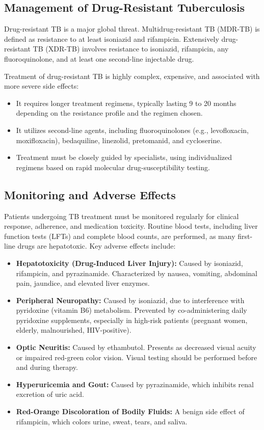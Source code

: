 \subsection*{Management of Drug-Resistant Tuberculosis}
Drug-resistant TB is a major global threat. Multidrug-resistant TB (MDR-TB) is defined as resistance to at least isoniazid and rifampicin. Extensively drug-resistant TB (XDR-TB) involves resistance to isoniazid, rifampicin, any fluoroquinolone, and at least one second-line injectable drug.

Treatment of drug-resistant TB is highly complex, expensive, and associated with more severe side effects:
\begin{itemize}
    \item It requires longer treatment regimens, typically lasting 9 to 20 months depending on the resistance profile and the regimen chosen.
    \item It utilizes second-line agents, including fluoroquinolones (e.g., levofloxacin, moxifloxacin), bedaquiline, linezolid, pretomanid, and cycloserine.
    \item Treatment must be closely guided by specialists, using individualized regimens based on rapid molecular drug-susceptibility testing.
\end{itemize}

\subsection*{Monitoring and Adverse Effects}
Patients undergoing TB treatment must be monitored regularly for clinical response, adherence, and medication toxicity. Routine blood tests, including liver function tests (LFTs) and complete blood counts, are performed, as many first-line drugs are hepatotoxic. Key adverse effects include:
\begin{itemize}
    \item \textbf{Hepatotoxicity (Drug-Induced Liver Injury):} Caused by isoniazid, rifampicin, and pyrazinamide. Characterized by nausea, vomiting, abdominal pain, jaundice, and elevated liver enzymes.
    \item \textbf{Peripheral Neuropathy:} Caused by isoniazid, due to interference with pyridoxine (vitamin B6) metabolism. Prevented by co-administering daily pyridoxine supplements, especially in high-risk patients (pregnant women, elderly, malnourished, HIV-positive).
    \item \textbf{Optic Neuritis:} Caused by ethambutol. Presents as decreased visual acuity or impaired red-green color vision. Visual testing should be performed before and during therapy.
    \item \textbf{Hyperuricemia and Gout:} Caused by pyrazinamide, which inhibits renal excretion of uric acid.
    \item \textbf{Red-Orange Discoloration of Bodily Fluids:} A benign side effect of rifampicin, which colors urine, sweat, tears, and saliva.
\end{itemize}

